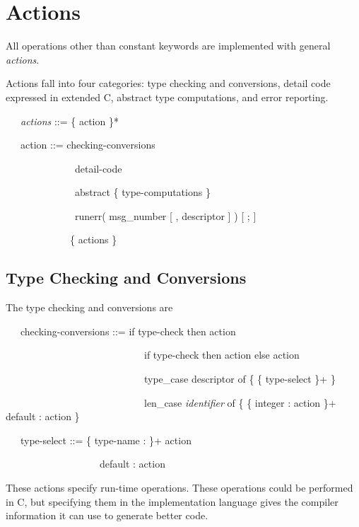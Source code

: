 \section{Actions }

All operations other than constant keywords are implemented with
general \textit{actions}.

Actions fall into four categories: type checking and conversions,
detail code expressed in extended C, abstract type computations, and
error reporting.

{\ttfamily\mdseries
\ \ \ \textit{actions} ::= \{ action \}*}

{\ttfamily\mdseries
\ \ \ action ::= checking-conversions {\textbar}}

{\ttfamily\mdseries
\ \ \ \ \ \ \ \ \ \ \ \ \ \ detail-code {\textbar}}

{\ttfamily\mdseries
\ \ \ \ \ \ \ \ \ \ \ \ \ \ abstract \{ type-computations \} {\textbar}}

{\ttfamily\mdseries
\ \ \ \ \ \ \ \ \ \ \ \ \ \ runerr( msg\_number [ , descriptor ] ) [ ; ]}

{\ttfamily\mdseries
\ \ \ \ \ \ \ \ \ \ \ \ \ \{ actions \}}

\subsection{Type Checking and Conversions}

The type checking and conversions are 

{\ttfamily\mdseries
\ \ \ checking-conversions ::= if type-check then action {\textbar}}

{\ttfamily\mdseries
\ \ \ \ \ \ \ \ \ \ \ \ \ \ \ \ \ \ \ \ \ \ \ \ \ \ \ \ if type-check then action else action {\textbar}}

{\ttfamily\mdseries
\ \ \ \ \ \ \ \ \ \ \ \ \ \ \ \ \ \ \ \ \ \ \ \ \ \ \ \ type\_case descriptor of \{ \{ type-select \}+ \} {\textbar}}

{\ttfamily\mdseries
\ \ \ \ \ \ \ \ \ \ \ \ \ \ \ \ \ \ \ \ \ \ \ \ \ \ \ \ len\_case \textit{identifier} of \{ \{ integer : action \}+
default : action \}}

{\ttfamily\mdseries
\ \ \ type-select ::= \{ type-name : \}+ action {\textbar}}

{\ttfamily\mdseries
\ \ \ \ \ \ \ \ \ \ \ \ \ \ \ \ \ \ \ default : action}


These actions specify run-time operations. These operations could be
performed in C, but specifying them in the implementation language
gives the compiler information it can use to generate better code.

